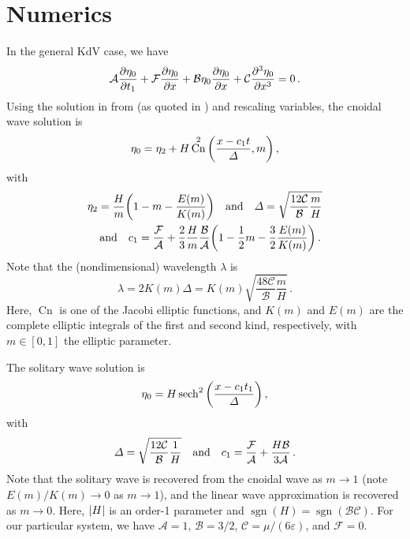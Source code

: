 \documentclass{jfm}
\DeclareMathOperator{\cn}{Cn}
\DeclareMathOperator{\sgn}{sgn}
\renewcommand*{\epsilon}{\varepsilon}
\begin{document}
\section{Numerics}
In the general KdV case, we have
\begin{equation}
  \mathcal{A} \pdv{\eta_0}{t_1} + \mathcal{F} \pdv{\eta_0}{x} + \mathcal{B}
  \eta_0 \pdv{\eta_0}{x} + \mathcal{C} \pdv[3]{\eta_0}{x} = 0 \,.
\end{equation}
Using the solution in from \citet{dingemans1997water} (as quoted in
\citeauthor{brun2018convective}) and rescaling variables, the cnoidal
wave solution is
\begin{equation}
  \eta_0 = \eta_2 + H \cn^2\pqty{\frac{x-c_1 t}{\Delta} , m} \,,
\end{equation}
with
\begin{gather}
  \eta_2 = \frac{H}{m} \pqty{1 - m - \frac{E(m)}{K(m)}}
  \qq{and}
  \Delta = \sqrt{\frac{12 \mathcal{C}}{\mathcal{B}} \frac{m}{H}}
  \label{eq:nondim_cnoidal_params}
  \\
  \qq{and}
  c_1 = \frac{\mathcal{F}}{\mathcal{A}} + \frac{2}{3} \frac{H}{m}
  \frac{\mathcal{B}}{\mathcal{A}} \pqty{1 - \frac{1}{2} m - \frac{3}{2}
    \frac{E(m)}{K(m)}} \,.
\end{gather}
Note that the (nondimensional) wavelength $\lambda$ is
\begin{equation}
  \lambda = 2 K(m) \Delta = K(m) \sqrt{\frac{48
  \mathcal{C}}{\mathcal{B}} \frac{m}{H}} \,.
  \label{eq:nondim_lambda}
\end{equation}
Here, $\cn$ is one of the Jacobi elliptic functions, and $K(m)$ and
$E(m)$ are the complete elliptic integrals of the first and second kind,
respectively, with $m \in [0,1]$ the elliptic parameter.

The solitary wave solution is
\begin{equation}
  \eta_0 = H \sech^2\pqty{\frac{x - c_1 t_1}{\Delta}} \,,
\end{equation}
with
\begin{equation}
  \Delta = \sqrt{\frac{12 \mathcal{C}}{\mathcal{B}} \frac{1}{H}}
  \qq{and}
  c_1 = \frac{\mathcal{F}}{\mathcal{A}} + \frac{H \mathcal{B}}{3
    \mathcal{A}} \,.
\end{equation}
Note that the solitary wave is recovered from the cnoidal wave as $m \to
1$ (note $E(m)/K(m) \to 0$ as $m \to 1$), and the linear wave
approximation is recovered as $m \to 0$.
Here, $\abs{H}$ is an order-1 parameter and $\sgn(H) = \sgn(\mathcal{B}
\mathcal{C})$.
For our particular system, we have $\mathcal{A} = 1$, $\mathcal{B} =
3/2$, $\mathcal{C} = \mu/(6\epsilon)$, and $\mathcal{F} = 0$.
\end{document}
